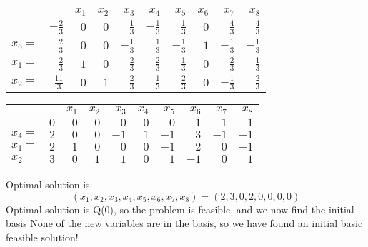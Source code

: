 \documentclass{article}
\theoremstyle{definition}
\begin{document}
\egroup
\bgroup
\def\arraystretch{1.5}
\begin{table}[H]
  \begin{tabular}{r|r|rrrrrrrr|}
  \cline{2-10}
    &   & $x_1$ & $x_2$ & $x_3$ & $x_4$ & $x_5$ & $x_6$ & $x_7$ & $x_8$ \\ \cline{2-10}
    & $-\tfrac{2}{3}$ & $0$ & $0$ & $\tfrac{1}{3}$ & $-\tfrac{1}{3}$ & $\tfrac{1}{3}$ & $0$ & $\tfrac{4}{3}$ & $\tfrac{4}{3}$ \\ \cline{2-10}
  $x_6 = $ & $\tfrac{2}{3}$ & $0$ & $0$ & $-\tfrac{1}{3}$ & $\tfrac{1}{3}$ & $-\tfrac{1}{3}$ & $1$ & $-\tfrac{1}{3}$ & $-\tfrac{1}{3}$ \\ 
  $x_1 = $ & $\tfrac{2}{3}$ & $1$ & $0$ & $\tfrac{2}{3}$ & $-\tfrac{2}{3}$ & $-\tfrac{1}{3}$ & $0$ & $\tfrac{2}{3}$ & $-\tfrac{1}{3}$ \\ 
  $x_2 = $ & $\tfrac{11}{3}$ & $0$ & $1$ & $\tfrac{2}{3}$ & $\tfrac{1}{3}$ & $\tfrac{2}{3}$ & $0$ & $-\tfrac{1}{3}$ & $\tfrac{2}{3}$ \\ \cline{2-10}
  \end{tabular}
\end{table}
\egroup
\bgroup
\def\arraystretch{1.5}
\begin{table}[H]
  \begin{tabular}{r|r|rrrrrrrr|}
  \cline{2-10}
    &   & $x_1$ & $x_2$ & $x_3$ & $x_4$ & $x_5$ & $x_6$ & $x_7$ & $x_8$ \\ \cline{2-10}
    & $0$ & $0$ & $0$ & $0$ & $0$ & $0$ & $1$ & $1$ & $1$ \\ \cline{2-10}
  $x_4 = $ & $2$ & $0$ & $0$ & $-1$ & $1$ & $-1$ & $3$ & $-1$ & $-1$ \\ 
  $x_1 = $ & $2$ & $1$ & $0$ & $0$ & $0$ & $-1$ & $2$ & $0$ & $-1$ \\ 
  $x_2 = $ & $3$ & $0$ & $1$ & $1$ & $0$ & $1$ & $-1$ & $0$ & $1$ \\ \cline{2-10}
  \end{tabular}
\end{table}
\egroup
Optimal solution is
\[
  (x_1, x_2, x_3, x_4, x_5, x_6, x_7, x_8) = (2, 3, 0, 2, 0, 0, 0, 0)
\]
Optimal solution is Q(0), so the problem is feasible, and we now find the initial basis
None of the new variables are in the basis, so we have found an initial basic feasible solution!
\end{document}
